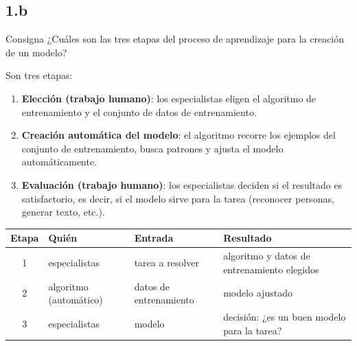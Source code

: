 \documentclass[11pt,a4paper]{article}
\begin{document}
\subsection{1.b}

\begin{enunciado}{Consigna}
¿Cuáles son las tres etapas del proceso de aprendizaje para la creación de un modelo?
\end{enunciado}

Son tres etapas:
\begin{enumerate}
  \item \textbf{Elección (trabajo humano)}: los especialistas eligen el algoritmo de entrenamiento y el conjunto de datos de entrenamiento.
  \item \textbf{Creación automática del modelo}: el algoritmo recorre los ejemplos del conjunto de entrenamiento, busca patrones y ajusta el modelo automáticamente.
  \item \textbf{Evaluación (trabajo humano)}: los especialistas deciden si el resultado es satisfactorio, es decir, si el modelo sirve para la tarea (reconocer personas, generar texto, etc.).
\end{enumerate}

\begin{center}
\small
\begin{tabularx}{\linewidth}{@{}c l l X@{}}
\toprule
\textbf{Etapa} & \textbf{Quién} & \textbf{Entrada} & \textbf{Resultado} \\
\midrule
1 & especialistas & tarea a resolver & algoritmo y datos de entrenamiento elegidos \\
2 & algoritmo (automático) & datos de entrenamiento & modelo ajustado \\
3 & especialistas & modelo & decisión: ¿es un buen modelo para la tarea? \\
\bottomrule
\end{tabularx}
\end{center}
\end{document}
